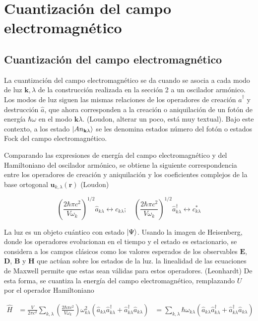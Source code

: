 \chapter{Cuantizaci\'on del campo electromagn\'etico}
\section{Cuantización del campo electromagnético}

La cuantización del campo electromagnético se da cuando se asocia a cada modo de luz $\mathbf{k},\lambda$ de la construcción realizada en la sección 2 a un oscilador armónico. Los modos de luz siguen las mismas relaciones de los operadores de creación $\hat{a}^{\dagger}$ y destrucción $\hat{a}$, que ahora corresponden a la creación o aniquilación de un fotón de energía $\hbar\omega$ en el modo $\mathbf{k}\lambda$. (Loudon, alterar un poco, está muy textual). Bajo este contexto, a los estado $\ket{A{n}_{\mathbf{k}\lambda}}$ se les denomina estados número del fotón o estados Fock del campo electromagnético.

Comparando las expresiones de energía del campo electromagnético y del Hamiltoniano del oscilador armónico, se obtiene la siguiente correspondencia entre los operadores de creación y aniquilación y los coeficientes complejos de la base ortogonal $\mathbf{u}_{k,\lambda}(\mathbf{r})$ (Loudon)

\begin{equation*}
\left( \frac{2\hbar \pi c^2}{V\omega_k} \right)^{1/2} \hat{a}_{k\lambda} \leftrightarrow c_{k\lambda}; \quad \left( \frac{2\hbar \pi c^2}{V\omega_k} \right)^{1/2} \hat{a}^{\dagger}_{k\lambda} \leftrightarrow c_{k\lambda}^*
\end{equation*}

La luz es un objeto cuántico con estado $\ket{\Psi}$. Usando la imagen de Heisenberg, donde los operadores evolucionan en el tiempo y el estado es estacionario, se considera a los campos clásicos como los valores esperados de los observables $\mathbf{E}$, $\mathbf{D}$, $\mathbf{B}$ y $\mathbf{H}$ que actúan sobre los estados de la luz. la linealidad de las ecuaciones de Maxwell  permite que estas sean válidas para estos operadores. (Leonhardt) De esta forma, se cuantiza la energía del campo electromagnético, remplazando $U$ por el operador Hamiltoniano

\begin{align*}
\hat{H} & =  \frac{V}{2\pi c^2}\sum_{k,\lambda} \left( \frac{2\hbar \pi c^2}{V\omega_k} \right) \omega_{k\lambda}^2 \left( \hat{a}_{k\lambda} \hat{a}^{\dagger}_{k\lambda} + \hat{a}^{\dagger}_{k\lambda} \hat{a}_{k\lambda} \right)
& = \sum_{k,\lambda} \hbar \omega_{k\lambda} \left( \hat{a}_{k\lambda} \hat{a}^{\dagger}_{k\lambda} + \hat{a}^{\dagger}_{k\lambda} \hat{a}_{k\lambda} \right)
\end{align*}

